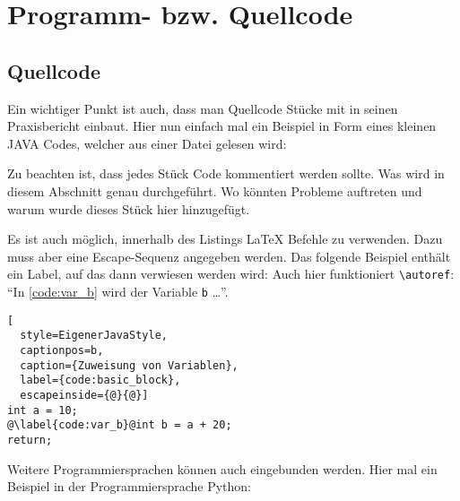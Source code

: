 \chapter{Programm- bzw. Quellcode}
\section{Quellcode}
Ein wichtiger Punkt ist auch, dass man Quellcode Stücke mit in seinen Praxisbericht einbaut. Hier nun einfach mal ein Beispiel in Form eines kleinen JAVA Codes, welcher aus einer Datei gelesen wird:



Zu beachten ist, dass jedes Stück Code kommentiert werden sollte. Was wird in diesem Abschnitt genau durchgeführt. Wo könnten Probleme auftreten und warum wurde dieses Stück hier hinzugefügt.

\vspace*{0.5cm}

\pagebreak

Es ist auch möglich, innerhalb des Listings \LaTeX{} Befehle zu verwenden. Dazu muss aber eine Escape-Sequenz angegeben werden. Das folgende Beispiel enthält ein Label, auf das dann verwiesen werden wird: Auch hier funktioniert \texttt{\textbackslash{}autoref}: \enquote{In \autoref{code:var_b} wird der Variable \texttt{b} \ldots}.

\begin{lstlisting}[
  style=EigenerJavaStyle,
  captionpos=b,
  caption={Zuweisung von Variablen},
  label={code:basic_block},
  escapeinside={@}{@}]
int a = 10;
@\label{code:var_b}@int b = a + 20;
return;
\end{lstlisting}

\pagebreak
Weitere Programmiersprachen können auch eingebunden werden. Hier mal ein Beispiel in der Programmiersprache Python:


